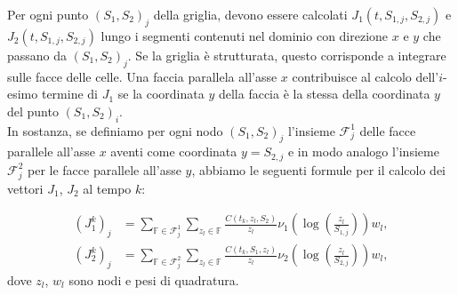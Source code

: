 \documentclass[a4paper,10pt]{report}
\theoremstyle{plain}
\theoremstyle{definition}
\theoremstyle{remark}
\begin{document}
Per ogni punto $(S_1,S_2)_j$ della griglia, devono essere calcolati $J_1(t,S_{1,j},S_{2,j})$ e $J_2(t,S_{1,j},S_{2,j})$ lungo i segmenti contenuti nel dominio con direzione $x$ e $y$ che passano da $(S_1,S_2)_j$. Se la griglia è strutturata, questo corrisponde a integrare sulle facce delle celle. Una faccia parallela all'asse $x$ contribuisce al calcolo dell'$i$-esimo termine di $J_1$ se la coordinata $y$ della faccia è la stessa della coordinata $y$ del punto $(S_1,S_2)_i$.\\
In sostanza, se definiamo per ogni nodo $(S_1,S_2)_j$ l'insieme $\mathcal{F}^1_j$ delle facce parallele all'asse $x$ aventi come coordinata $y=S_{2,j}$ e in modo analogo l'insieme $\mathcal{F}^2_j$ per le facce parallele all'asse $y$, abbiamo le seguenti formule per il calcolo dei vettori $J_1$, $J_2$ al tempo $k$:

\begin{align*}
 (J_1^{k})_j&=\sum\limits_{\mathbb{F}\in \mathcal{F}^1_j} \sum\limits_{z_l \in \mathbb{F}}\frac{C(t_k,z_l,S_2)}{z_l}\nu_1\left(\log\left(\frac{z_l}{S_{1,j}}\right)\right)w_l,\\
 (J_2^{k})_j&=\sum\limits_{\mathbb{F}\in \mathcal{F}^2_j} \sum\limits_{z_l \in \mathbb{F}}\frac{C(t_k,S_1,z_l)}{z_l}\nu_2\left(\log\left(\frac{z_l}{S_{2,j}}\right)\right)w_l,
\end{align*}
dove $z_l$, $w_l$ sono nodi e pesi di quadratura.
\end{document}
